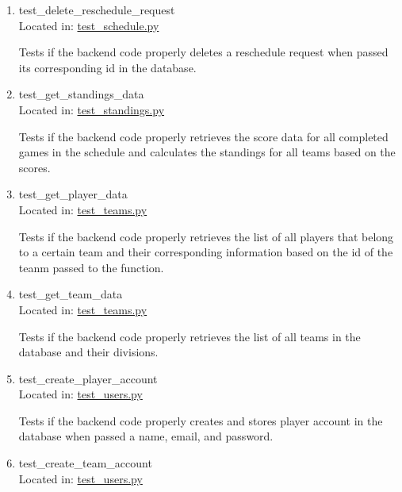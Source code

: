 \documentclass[12pt, titlepage]{article}
\begin{document}
\begin{enumerate}
  \item{test\_delete\_reschedule\_request\\}
  Located in: \href{https://github.com/Nicholas-Fabugais-Inaba/Sandlot/blob/pytest-workflow/test/test\_schedule.py}{test\_schedule.py}
  
  Tests if the backend code properly deletes a reschedule request when passed its 
  corresponding id in the database.

  \item{test\_get\_standings\_data\\}
  Located in: \href{https://github.com/Nicholas-Fabugais-Inaba/Sandlot/blob/pytest-workflow/test/test_standings.py}{test\_standings.py}
  
  Tests if the backend code properly retrieves the score data for all completed games
  in the schedule and calculates the standings for all teams based on the scores.
  
  \item{test\_get\_player\_data\\}
  Located in: \href{https://github.com/Nicholas-Fabugais-Inaba/Sandlot/blob/pytest-workflow/test/test_teams.py}{test\_teams.py}
  
  Tests if the backend code properly retrieves the list of all players that belong to a 
  certain team and their corresponding information based on the id of the teanm passed to
  the function.

  \item{test\_get\_team\_data\\}
  Located in: \href{https://github.com/Nicholas-Fabugais-Inaba/Sandlot/blob/pytest-workflow/test/test_teams.py}{test\_teams.py}
  
  Tests if the backend code properly retrieves the list of all teams in the database and 
  their divisions.

  \item{test\_create\_player\_account\\}
  Located in: \href{https://github.com/Nicholas-Fabugais-Inaba/Sandlot/blob/pytest-workflow/test/test_users.py}{test\_users.py}
  
  Tests if the backend code properly creates and stores player account in the database 
  when passed a name, email, and password.

  \item{test\_create\_team\_account\\}
  Located in: \href{https://github.com/Nicholas-Fabugais-Inaba/Sandlot/blob/pytest-workflow/test/test_users.py}{test\_users.py}
  

\end{enumerate}
\end{document}

